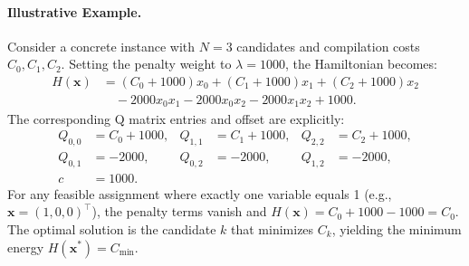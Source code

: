 \documentclass[12pt]{article}
\begin{document}
\paragraph{Illustrative Example.}
Consider a concrete instance with $N=3$ candidates and compilation costs $C_0, C_1, C_2$. Setting the penalty weight to $\lambda = 1000$, the Hamiltonian becomes:
\begin{align}
    H(\mathbf{x}) &= (C_0 + 1000)x_0 + (C_1 + 1000)x_1 + (C_2 + 1000)x_2 \\
    &\quad - 2000 x_0 x_1 - 2000 x_0 x_2 - 2000 x_1 x_2 + 1000.
\end{align}
The corresponding Q matrix entries and offset are explicitly:
\begin{align}
    Q_{0,0} &= C_0 + 1000, & Q_{1,1} &= C_1 + 1000, & Q_{2,2} &= C_2 + 1000, \\
    Q_{0,1} &= -2000, & Q_{0,2} &= -2000, & Q_{1,2} &= -2000, \\
    c &= 1000.
\end{align}
For any feasible assignment where exactly one variable equals 1 (e.g., $\mathbf{x} = (1,0,0)^\top$), the penalty terms vanish and $H(\mathbf{x}) = C_0 + 1000 - 1000 = C_0$. The optimal solution is the candidate $k$ that minimizes $C_k$, yielding the minimum energy $H(\mathbf{x}^*) = C_{\min}$.
\end{document}
